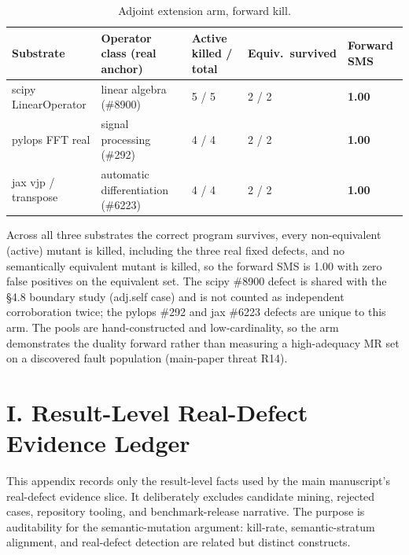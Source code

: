 \documentclass[manuscript,screen,review]{acmart}
\begin{document}
{%
\begin{longtable}[]{@{}p{2.0cm}p{3.2cm}p{2.5cm}p{1.8cm}p{1.8cm}@{}}
\caption{Adjoint extension arm, forward kill.}\label{tab:suppl-adjoint}\\
\toprule\noalign{}
Substrate & Operator class (real anchor) & Active killed / total & Equiv.\ survived & Forward SMS \\
\midrule\noalign{}
\endfirsthead
\endhead
\bottomrule\noalign{}
\endlastfoot
scipy LinearOperator & linear algebra (\#8900) & 5 / 5 & 2 / 2 & \textbf{1.00} \\
pylops FFT real & signal processing (\#292) & 4 / 4 & 2 / 2 & \textbf{1.00} \\
jax vjp / transpose & automatic differentiation (\#6223) & 4 / 4 & 2 / 2 & \textbf{1.00} \\
\end{longtable}
}

Across all three substrates the correct program survives, every
non-equivalent (active) mutant is killed, including the three real
fixed defects, and no semantically equivalent mutant is killed, so the
forward SMS is 1.00 with zero false positives on the equivalent set. The
scipy \#8900 defect is shared with the §4.8 boundary study (adj.self case)
and is not counted as independent corroboration twice; the pylops \#292
and jax \#6223 defects are unique to this arm. The pools are
hand-constructed and low-cardinality, so the arm demonstrates the duality
forward rather than measuring a high-adequacy MR set on a discovered fault
population (main-paper threat R14).

\section{I. Result-Level Real-Defect Evidence Ledger}\label{i.-result-level-real-defect-evidence-ledger}

This appendix records only the result-level facts used by the main
manuscript's real-defect evidence slice. It deliberately excludes
candidate mining, rejected cases, repository tooling, and benchmark-release
narrative. The purpose is auditability for the semantic-mutation argument:
kill-rate, semantic-stratum alignment, and real-defect detection are related
but distinct constructs.
\end{document}
